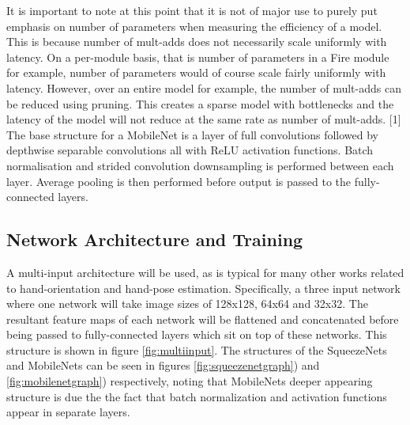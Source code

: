 \documentclass{article}
\begin{document}
It is important to note at this point that it is not of major use to purely put emphasis on number of parameters when measuring the efficiency of a model. This is because number of mult-adds does not necessarily scale uniformly with latency. On a per-module basis, that is number of parameters in a Fire module for example, number of parameters would of course scale fairly uniformly with latency. However, over an entire model for example, the number of mult-adds can be reduced using pruning. This creates a sparse model with bottlenecks and the latency of the model will not reduce at the same rate as number of mult-adds. [1] \\

The base structure for a MobileNet is a layer of full convolutions followed by depthwise separable convolutions all with ReLU activation functions. Batch normalisation and strided convolution downsampling is performed between each layer. Average pooling is then performed before output is passed to the fully-connected layers.\\


\subsection{Network Architecture and Training}
A multi-input architecture will be used, as is typical for many other works related to hand-orientation and hand-pose estimation. Specifically, a three input network where one network will take image sizes of 128x128, 64x64 and 32x32. The resultant feature maps of each network will be flattened and concatenated before being passed to fully-connected layers which sit on top of these networks. This structure is shown in figure \ref{fig:multiinput}. The structures of the SqueezeNets and MobileNets can be seen in figures \ref{fig:squeezenetgraph}) and \ref{fig:mobilenetgraph}) respectively, noting that MobileNets deeper appearing structure is due the the fact that batch normalization and activation functions appear in separate layers.\\
\end{document}
